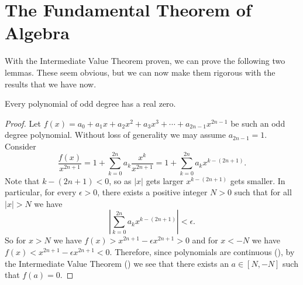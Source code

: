 \section{The Fundamental Theorem of Algebra}
With the Intermediate Value Theorem proven, we can prove the following two lemmas. These seem obvious, but we can now make them rigorous with the results that we have now.

\begin{lemma}\label{lemma-odd-degree-polynomial-has-real-zero}
    Every polynomial of odd degree has a real zero.
\end{lemma}
\begin{proof}
    Let $f(x) = a_0 + a_1x + a_2x^2 + a_3x^3 + \cdots + a_{2n-1}x^{2n-1}$ be such an odd degree polynomial. Without loss of generality we may assume $a_{2n-1} = 1$. Consider
    \[
        \frac{f(x)}{x^{2n+1}} = 1 + \sum_{k=0}^{2n}a_k\frac{x^k}{x^{2n+1}} = 1 + \sum_{k=0}^{2n}a_kx^{k-(2n+1)}.
    \]
    Note that $k - (2n+1) < 0$, so as $|x|$ gets larger $x^{k-(2n+1)}$ gets smaller. In particular, for every $\epsilon > 0$, there exists a positive integer $N > 0$ such that for all $|x| > N$ we have
    \[
        \left|\sum_{k=0}^{2n}a_kx^{k-(2n+1)}\right| < \epsilon.
    \]
    So for $x > N$ we have $f(x) > x^{2n+1} - \epsilon x^{2n+1} > 0$ and for $x < -N$ we have $f(x) < x^{2n+1} - \epsilon x^{2n+1} < 0$. Therefore, since polynomials are continuous (), by the Intermediate Value Theorem () we see that there exists an $a \in [N, -N]$ such that $f(a) = 0$.
\end{proof}

